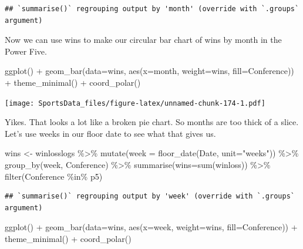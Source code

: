 \documentclass[
]{book}
\newenvironment{Shaded}{\begin{snugshade}}{\end{snugshade}}
\newcommand{\AttributeTok}[1]{\textcolor[rgb]{0.77,0.63,0.00}{#1}}
\newcommand{\FunctionTok}[1]{\textcolor[rgb]{0.00,0.00,0.00}{#1}}
\newcommand{\NormalTok}[1]{#1}
\newcommand{\OtherTok}[1]{\textcolor[rgb]{0.56,0.35,0.01}{#1}}
\newcommand{\SpecialCharTok}[1]{\textcolor[rgb]{0.00,0.00,0.00}{#1}}
\newcommand{\StringTok}[1]{\textcolor[rgb]{0.31,0.60,0.02}{#1}}
\begin{document}
\begin{verbatim}
## `summarise()` regrouping output by 'month' (override with `.groups` argument)
\end{verbatim}

Now we can use wins to make our circular bar chart of wins by month in the Power Five.

\begin{Shaded}
\begin{Highlighting}[]
\FunctionTok{ggplot}\NormalTok{() }\SpecialCharTok{+} \FunctionTok{geom\_bar}\NormalTok{(}\AttributeTok{data=}\NormalTok{wins, }\FunctionTok{aes}\NormalTok{(}\AttributeTok{x=}\NormalTok{month, }\AttributeTok{weight=}\NormalTok{wins, }\AttributeTok{fill=}\NormalTok{Conference)) }\SpecialCharTok{+} \FunctionTok{theme\_minimal}\NormalTok{() }\SpecialCharTok{+} \FunctionTok{coord\_polar}\NormalTok{()}
\end{Highlighting}
\end{Shaded}

\texttt{[image: SportsData\_files/figure-latex/unnamed-chunk-174-1.pdf]}

Yikes. That looks a lot like a broken pie chart. So months are too thick of a slice. Let's use weeks in our floor date to see what that gives us.

\begin{Shaded}
\begin{Highlighting}[]
\NormalTok{wins }\OtherTok{\textless{}{-}}\NormalTok{ winlosslogs }\SpecialCharTok{\%\textgreater{}\%} \FunctionTok{mutate}\NormalTok{(}\AttributeTok{week =} \FunctionTok{floor\_date}\NormalTok{(Date, }\AttributeTok{unit=}\StringTok{"weeks"}\NormalTok{)) }\SpecialCharTok{\%\textgreater{}\%} \FunctionTok{group\_by}\NormalTok{(week, Conference) }\SpecialCharTok{\%\textgreater{}\%} \FunctionTok{summarise}\NormalTok{(}\AttributeTok{wins=}\FunctionTok{sum}\NormalTok{(winloss)) }\SpecialCharTok{\%\textgreater{}\%} \FunctionTok{filter}\NormalTok{(Conference }\SpecialCharTok{\%in\%}\NormalTok{ p5) }
\end{Highlighting}
\end{Shaded}

\begin{verbatim}
## `summarise()` regrouping output by 'week' (override with `.groups` argument)
\end{verbatim}

\begin{Shaded}
\begin{Highlighting}[]
\FunctionTok{ggplot}\NormalTok{() }\SpecialCharTok{+} \FunctionTok{geom\_bar}\NormalTok{(}\AttributeTok{data=}\NormalTok{wins, }\FunctionTok{aes}\NormalTok{(}\AttributeTok{x=}\NormalTok{week, }\AttributeTok{weight=}\NormalTok{wins, }\AttributeTok{fill=}\NormalTok{Conference)) }\SpecialCharTok{+} \FunctionTok{theme\_minimal}\NormalTok{() }\SpecialCharTok{+} \FunctionTok{coord\_polar}\NormalTok{()}
\end{Highlighting}
\end{Shaded}
\end{document}
